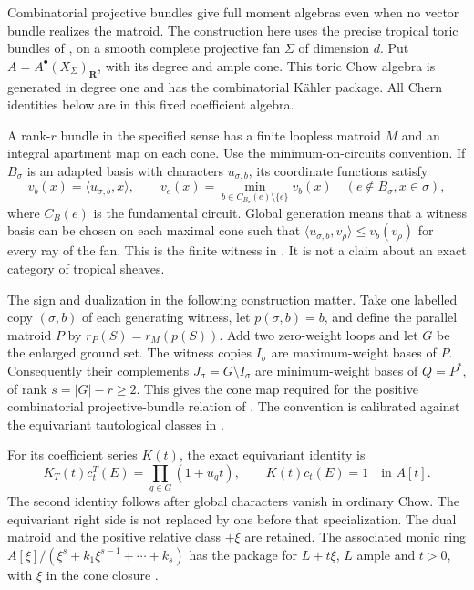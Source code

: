 Combinatorial projective bundles give full moment algebras even
when no vector bundle realizes the matroid. The construction here
uses the precise tropical toric bundles of
\cite{KavehManon24TropicalBundlesV2}, on a smooth complete
projective fan $\Sigma$ of dimension $d$. Put
$A=A^\bullet(X_\Sigma)_{\mathbf R}$, with its degree and ample
cone. This toric Chow algebra is generated in degree one and
has the combinatorial K\"ahler package. All Chern identities below
are in this fixed coefficient algebra.

A rank-$r$ bundle in the specified sense has a finite loopless
matroid $M$ and an integral apartment map on each cone. Use the
minimum-on-circuits convention. If $B_\sigma$ is an adapted basis
with characters $u_{\sigma,b}$, its coordinate functions satisfy
\[
 v_b(x)=\langle u_{\sigma,b},x\rangle,
 \qquad
 v_e(x)=\min_{b\in C_{B_\sigma}(e)\setminus\{e\}}v_b(x)
       \quad(e\notin B_\sigma, x\in\sigma),
\tag{G.27}\label{eq:appG-KM-apartment}
\]
where $C_B(e)$ is the fundamental circuit. Global generation
means that a witness basis can be chosen on each maximal cone
such that $\langle u_{\sigma,b},v_\rho\rangle\leq v_b(v_\rho)$
for every ray of the fan. This is the finite witness in
\cite[Definition~6.4 and Theorem~6.5]{KavehManon24TropicalBundlesV2}.
It is not a claim about an exact category of tropical sheaves.

The sign and dualization in the following construction matter.
Take one labelled copy $(\sigma,b)$ of each generating witness,
let $p(\sigma,b)=b$, and define the parallel matroid $P$ by
$r_P(S)=r_M(p(S))$. Add two zero-weight loops and let $G$ be
the enlarged ground set. The witness copies $I_\sigma$ are
maximum-weight bases of $P$. Consequently their complements
$J_\sigma=G\setminus I_\sigma$ are minimum-weight bases of
$Q=P^*$, of rank $s=|G|-r\geq2$.
This gives the cone map required for the positive combinatorial
projective-bundle relation of
\cite[Theorem~3.9]{LarsonPartida26ProjectiveBundlesV1}.
The convention is calibrated against the equivariant tautological
classes in \cite[\S3]{BergetEurSpinkTseng23TautologicalV4}.

For its coefficient series $K(t)$, the exact equivariant identity is
\[
 K_T(t)c_t^T(E)=\prod_{g\in G}(1+u_gt),
 \qquad K(t)c_t(E)=1\quad\text{in }A[t].
\tag{G.28}\label{eq:appG-tropical-Chern-inverse}
\]
The second identity follows after global characters vanish in
ordinary Chow. The equivariant right side is not replaced by one
before that specialization. The dual matroid and the positive
relative class $+\xi$ are retained. The associated monic ring
$A[\xi]/(\xi^s+k_1\xi^{s-1}+\cdots+k_s)$ has the package for
$L+t\xi$, $L$ ample and $t>0$, with $\xi$ in the cone closure
\cite[Theorem~7.6]{NguyenDangWang26ChernFlowV4}.

